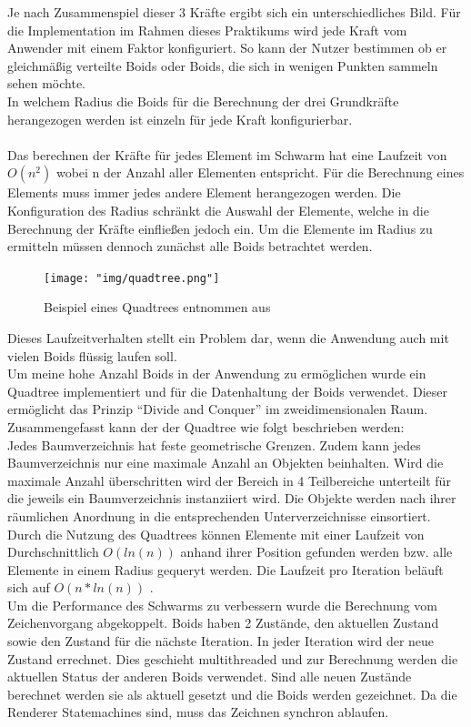 \documentclass[../mciAusarbeitung.tex]{subfiles}
\begin{document}
	Je nach Zusammenspiel dieser 3 Kräfte ergibt sich ein unterschiedliches Bild. Für die Implementation im Rahmen dieses Praktikums wird jede Kraft vom Anwender mit einem Faktor konfiguriert. So kann der Nutzer bestimmen ob er gleichmäßig verteilte Boids oder Boids, die sich in wenigen Punkten sammeln sehen möchte.\\
	In welchem Radius die Boids für die Berechnung der drei Grundkräfte herangezogen werden ist einzeln für jede Kraft konfigurierbar.\\\\
	Das berechnen der Kräfte für jedes Element im Schwarm hat eine Laufzeit von $O(n^2)$ wobei n der Anzahl aller Elementen entspricht. Für die Berechnung eines Elements muss immer jedes andere Element herangezogen werden.
	Die Konfiguration des Radius schränkt die Auswahl der Elemente, welche in die Berechnung der Kräfte einfließen jedoch ein. Um die Elemente im Radius zu ermitteln müssen dennoch zunächst alle Boids betrachtet werden.
\begin{figure}
	\center
	\texttt{[image: "img/quadtree.png"]}
	\caption{Beispiel eines Quadtrees entnommen aus \cite{DavidEppstein2005}}  
\end{figure}	
	Dieses Laufzeitverhalten stellt ein Problem dar, wenn die Anwendung auch mit vielen Boids flüssig laufen soll. \\
	Um meine hohe Anzahl Boids in der Anwendung zu ermöglichen wurde ein Quadtree implementiert und für die Datenhaltung der Boids verwendet. Dieser ermöglicht das Prinzip ``Divide and Conquer'' im zweidimensionalen Raum. Zusammengefasst kann der der Quadtree wie folgt beschrieben werden: \\
	Jedes Baumverzeichnis hat feste geometrische Grenzen. Zudem kann jedes Baumverzeichnis nur eine maximale Anzahl an Objekten beinhalten. Wird die maximale Anzahl überschritten wird der Bereich in 4 Teilbereiche unterteilt für die jeweils ein Baumverzeichnis instanziiert wird. Die Objekte werden nach ihrer räumlichen Anordnung in die entsprechenden Unterverzeichnisse einsortiert.\\	
	Durch die Nutzung des Quadtrees können Elemente mit einer Laufzeit von Durchschnittlich $O(ln(n))$ anhand ihrer Position gefunden werden bzw. alle Elemente in einem Radius gequeryt werden. Die Laufzeit pro Iteration beläuft sich auf $O(n*ln(n))$ \cite{Samet}.\\
	Um die Performance des Schwarms zu verbessern wurde die Berechnung vom Zeichenvorgang abgekoppelt. Boids haben 2 Zustände, den aktuellen Zustand sowie den Zustand für die nächste Iteration. In jeder Iteration wird der neue Zustand errechnet. Dies geschieht multithreaded und zur Berechnung werden die aktuellen Status der anderen Boids verwendet. Sind alle neuen Zustände berechnet werden sie als aktuell gesetzt und die Boids werden gezeichnet. Da die Renderer Statemachines sind, muss das Zeichnen synchron ablaufen.\\
\end{document}
